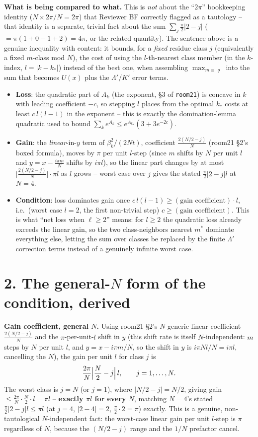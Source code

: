\documentclass[11pt]{article}
\begin{document}
\textbf{What is being compared to what.} This is \emph{not} about the ``$2\pi$'' bookkeeping
identity ($N\times2\pi/N=2\pi$) that Reviewer BF correctly flagged as a tautology -- that identity
is a separate, trivial fact about the sum $\sum_j\frac\pi2|2-j|$ ($=\pi(1+0+1+2)=4\pi$, or the
related quantity). The sentence above is a genuine inequality with content: it bounds, for a
\emph{fixed} residue class $j$ (equivalently a fixed $m$-class mod $N$), the cost of using the
$l$-th-nearest class member (in the $k$-index, $l=|k-k_*|$) instead of the best one, when
assembling $\max_{m\equiv\varrho}$ into the sum that becomes $U(x)$ plus the $\Lambda'$/$K'$ error
terms.
\begin{itemize}
\item \textbf{Loss}: the quadratic part of $A_k$ (the exponent, \S3 of \texttt{room21}) is concave
in $k$ with leading coefficient $-c$, so stepping $l$ places from the optimal $k_*$ costs at least
$c\,l(l-1)$ in the exponent -- this is exactly the domination-lemma quadratic used to bound
$\sum_ke^{A_k}\le e^{A_{k_*}}(3+3e^{-2c})$.
\item \textbf{Gain}: the \emph{linear}-in-$y$ term of $\beta_k^2/(2Nt)$, coefficient
$\frac{2(N/2-j)}N$ (room21 \S2's boxed formula), moves by $\pi$ per unit $l$-step (since $m$ shifts
by $N$ per unit $l$ and $y=x-\frac{i\pi m}N$ shifts by $i\pi l$), so the linear part changes by at
most $\bigl|\frac{2(N/2-j)}N\bigr|\cdot\pi l$ as $l$ grows -- worst case over $j$ gives the stated
$\frac\pi2|2-j|l$ at $N=4$.
\item \textbf{Condition}: loss dominates gain once $c\,l(l-1)\ge(\text{gain coefficient})\cdot l$,
i.e.\ (worst case $l=2$, the first non-trivial step) $c\ge(\text{gain coefficient})$. This is what
``net loss when $\ell\ge2$'' means: for $l\ge2$ the quadratic loss already exceeds the linear gain,
so the two class-neighbors nearest $m^*$ dominate everything else, letting the sum over classes be
replaced by the finite $\Lambda'$ correction terms instead of a genuinely infinite worst case.
\end{itemize}

\section*{2. The general-$N$ form of the condition, derived}

\textbf{Gain coefficient, general $N$.} Using room21 \S2's $N$-generic linear coefficient
$\frac{2(N/2-j)}N$ and the $\pi$-per-unit-$l$ shift in $y$ (this shift rate is itself
$N$-independent: $m$ steps by $N$ per unit $l$, and $y=x-i\pi m/N$, so the shift in $y$ is
$i\pi N l/N=i\pi l$, cancelling the $N$), the gain per unit $l$ for class $j$ is
\[
  \frac{2\pi}N\Bigl|\frac N2-j\Bigr|\,l,\qquad j=1,\dots,N.
\]
The worst class is $j=N$ (or $j=1$), where $|N/2-j|=N/2$, giving gain $\le\frac{2\pi}N\cdot\frac
N2\cdot l=\pi l$ -- \textbf{exactly $\pi l$ for every $N$}, matching $N=4$'s stated
$\frac\pi2|2-j|l\le\pi l$ (at $j=4$, $|2-4|=2$, $\frac\pi2\cdot2=\pi$) exactly. This is a genuine,
non-tautological $N$-independent fact: the worst-case linear gain per unit $l$-step is $\pi$
regardless of $N$, because the $(N/2-j)$ range and the $1/N$ prefactor cancel.
\end{document}
